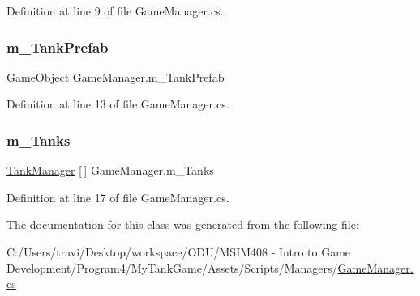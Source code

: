 Definition at line 9 of file Game\+Manager.\+cs.

\mbox{\label{class_game_manager_abd37cb1a8777348319275ea8d59f7879}} 
\subsubsection{\texorpdfstring{m\+\_\+\+Tank\+Prefab}{m\_TankPrefab}}
{\footnotesize\ttfamily Game\+Object Game\+Manager.\+m\+\_\+\+Tank\+Prefab}



Definition at line 13 of file Game\+Manager.\+cs.

\mbox{\label{class_game_manager_ad3c238e7c632868e7eb9c3feaae67647}} 
\subsubsection{\texorpdfstring{m\+\_\+\+Tanks}{m\_Tanks}}
{\footnotesize\ttfamily \hyperlink{class_tank_manager}{Tank\+Manager} \mbox{[}$\,$\mbox{]} Game\+Manager.\+m\+\_\+\+Tanks}



Definition at line 17 of file Game\+Manager.\+cs.



The documentation for this class was generated from the following file\+:\begin{DoxyCompactItemize}
\item 
C\+:/\+Users/travi/\+Desktop/workspace/\+O\+D\+U/\+M\+S\+I\+M408 -\/ Intro to Game Development/\+Program4/\+My\+Tank\+Game/\+Assets/\+Scripts/\+Managers/\hyperlink{_game_manager_8cs}{Game\+Manager.\+cs}\end{DoxyCompactItemize}
